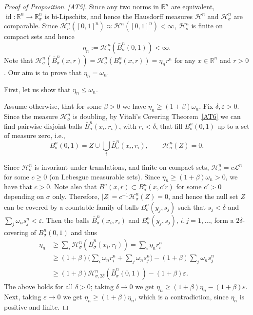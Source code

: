 \documentclass[12pt,leqno]{amsart}
\theoremstyle{definition}
\newcommand{\bbbr}{\mathbb R}
\newcommand{\eps}{\varepsilon}
\def\H{{\mathcal H}}
\def\LL{{\mathcal L}}
\numberwithin{theorem}{section} \numberwithin{equation}{section}
\begin{document}
\begin{proof}[Proof of Proposition~\ref{AT5}]
Since any two norms in $\bbbr^n$ are equivalent, $\operatorname{id}:\bbbr^n\to\bbbr^n_\sigma$ is bi-Lipschitz, and hence the Hausdorff measures $\H^n$ and $\H^n_\sigma$ are comparable. Since $\H^n_\sigma([0,1]^n)\approx\H^n([0,1]^n)<\infty$, $\H^n_\sigma$ is finite on compact sets and hence
$$
\eta_n:=\H^n_\sigma(\bar{B}^n_\sigma(0,1))<\infty.
$$
Note that $\H^n_\sigma(\bar{B}^n_\sigma(x,r))=\H^n_\sigma(B^n_\sigma(x,r))=\eta_n r^n$ for any $x\in\bbbr^n$ and $r>0$.
Our aim is to prove that $\eta_n=\omega_n$.

First, let us show that $\eta_n\leq\omega_n$.

Assume otherwise, that for some $\beta>0$ we have $\eta_n\geq(1+\beta)\omega_n$. Fix $\delta, \eps>0$.  Since the measure $\H^n_\sigma$ is doubling, by Vitali's Covering Theorem~\ref{AT6} we can find pairwise disjoint balls $\bar{B}^n_\sigma(x_i,r_i)$, with $r_i<\delta$, that fill $B^n_\sigma(0,1)$ up to a set of measure zero, i.e.,
$$
B^n_\sigma(0,1)=Z\cup\bigcup_i \bar{B}^n_\sigma(x_i,r_i), \qquad \H^n_\sigma(Z)=0.
$$

Since $\H^n_\sigma$ is invariant under translations, and finite on compact sets, $\H^n_\sigma=c\LL^n$ for some $c\geq 0$ (on Lebesgue measurable sets). Since $\eta_n\geq (1+\beta)\omega_n>0$, we have that $c>0$. Note also that $B^n(x,r)\subset B_\sigma^n(x,c'r)$ for some $c'>0$ depending on $\sigma$ only.
Therefore, $|Z|=c^{-1}\H^n_\sigma(Z)=0$, and hence
the null set $Z$ can be covered by a countable family of balls $B^n_\sigma(y_j,s_j)$ such that $s_j<\delta$ and $\sum_j\omega_n s_j^n<\eps$. Then the balls $\bar{B}^n_\sigma(x_i,r_i)$ and $B^n_\sigma(y_j,s_j)$, $i,j=1,\ldots$, form a $2\delta$-covering of $B^n_\sigma(0,1)$ and thus
\begin{equation*}
\begin{split}
\eta_n
&\geq
\sum_i \H^n_\sigma( \bar{B}^n_\sigma(x_i,r_i))
=\sum_i \eta_n r_i^n\\
&\geq(1+\beta)\Big(\sum_i \omega_n r_i^n+\sum_j \omega_n s_j^n\Big)-(1+\beta)\sum_j \omega_n s_j^n\\
&\geq (1+\beta)\H^n_{\sigma,2\delta}(\bar{B}^n_\sigma(0,1))-(1+\beta)\eps.
\end{split}
\end{equation*}
The above holds for all $\delta>0$; taking $\delta\to 0$ we get
$
\eta_n\geq (1+\beta)\eta_n-(1+\beta)\eps.
$
Next, taking $\eps\to 0$ we get $\eta_n\geq (1+\beta)\eta_n$, which is a contradiction, since $\eta_n$ is positive and finite.


\end{proof}
\end{document}
